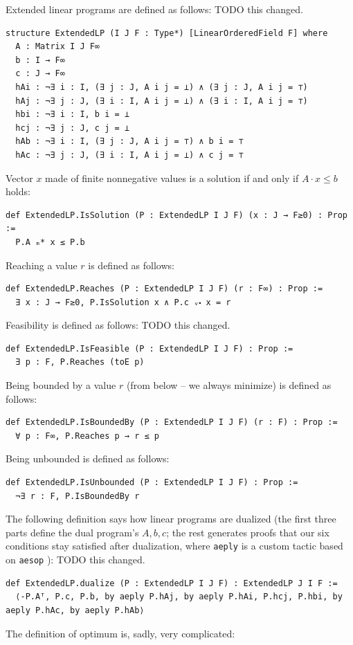 \documentclass[]{article}
\renewcommand{\.}{\hskip .75pt}
\let\*=\cdot
\begin{document}
Extended linear programs are defined as follows: {\color{blue} TODO this changed.}
\begin{lstlisting}
structure ExtendedLP (I J F : Type*) [LinearOrderedField F] where
  A : Matrix I J F∞
  b : I → F∞
  c : J → F∞
  hAi : ¬∃ i : I, (∃ j : J, A i j = ⊥) ∧ (∃ j : J, A i j = ⊤)
  hAj : ¬∃ j : J, (∃ i : I, A i j = ⊥) ∧ (∃ i : I, A i j = ⊤)
  hbi : ¬∃ i : I, b i = ⊥
  hcj : ¬∃ j : J, c j = ⊥
  hAb : ¬∃ i : I, (∃ j : J, A i j = ⊤) ∧ b i = ⊤
  hAc : ¬∃ j : J, (∃ i : I, A i j = ⊥) ∧ c j = ⊤
\end{lstlisting}
Vector $x$ made of finite nonnegative values is a solution if and only if $A \* x \le b$
holds:
\begin{lstlisting}
def ExtendedLP.IsSolution (P : ExtendedLP I J F) (x : J → F≥0) : Prop :=
  P.A ₘ* x ≤ P.b
\end{lstlisting}
Reaching a value $r$ is defined as follows:
\begin{lstlisting}
def ExtendedLP.Reaches (P : ExtendedLP I J F) (r : F∞) : Prop :=
  ∃ x : J → F≥0, P.IsSolution x ∧ P.c ᵥ⬝ x = r
\end{lstlisting}
Feasibility is defined as follows: {\color{blue} TODO this changed.}
\begin{lstlisting}
def ExtendedLP.IsFeasible (P : ExtendedLP I J F) : Prop :=
  ∃ p : F, P.Reaches (toE p)
\end{lstlisting}
Being bounded by a value $r$ (from below -- we always minimize) is defined as follows:
\begin{lstlisting}
def ExtendedLP.IsBoundedBy (P : ExtendedLP I J F) (r : F) : Prop :=
  ∀ p : F∞, P.Reaches p → r ≤ p
\end{lstlisting}
Being unbounded is defined as follows:
\begin{lstlisting}
def ExtendedLP.IsUnbounded (P : ExtendedLP I J F) : Prop :=
  ¬∃ r : F, P.IsBoundedBy r
\end{lstlisting}
The following definition says how linear programs are dualized (the first three parts
define the dual program's $A, b, c$; the rest generates proofs that our six conditions stay satisfied
after dualization, where \texttt{aeply} is a custom tactic based on \texttt{aesop} \cite{Aesop}):
{\color{blue} TODO this changed.}
\begin{lstlisting}
def ExtendedLP.dualize (P : ExtendedLP I J F) : ExtendedLP J I F :=
  ⟨-P.Aᵀ, P.c, P.b, by aeply P.hAj, by aeply P.hAi, P.hcj, P.hbi, by aeply P.hAc, by aeply P.hAb⟩
\end{lstlisting}
The definition of optimum is, sadly, very complicated:
\end{document}
